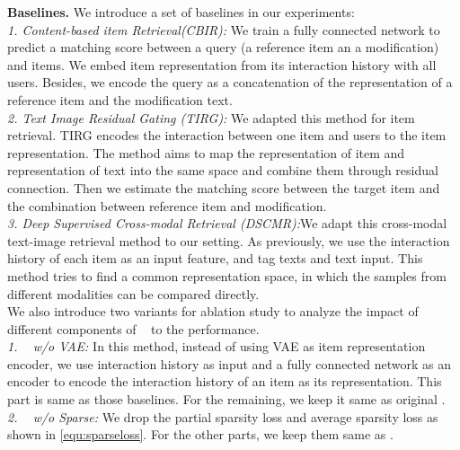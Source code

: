 \textbf{Baselines.} We introduce a set of baselines in our experiments:\\
\textit{1. Content-based item Retrieval(CBIR):} We train a fully connected network to predict a matching score between a query (a reference item an a modification) and items. We embed item representation from its interaction history with all users. Besides, we encode the query as a concatenation of the representation of a reference item and the modification text.\\
\textit{2. Text Image Residual Gating \cite{Vo19TIRG} (TIRG):} We adapted this method for item retrieval. TIRG encodes the interaction between one item and users to the item representation. The method aims to map the representation of item and representation of text into the same space and combine them through residual connection. Then we estimate the matching score between the target item and the combination between reference item and modification.\\
\textit{3. Deep Supervised Cross-modal Retrieval \cite{Zhen19DSCMR} (DSCMR):}We adapt this cross-modal text-image retrieval method to our setting. As previously, we use the interaction history of each item as an input feature, and tag texts and text input. This method tries to find a common representation space, in which the samples from different modalities can be compared directly.\\
We also introduce two variants for ablation study to analyze the impact of different components of \CGIR~ to the performance.\\
\textit{1. \CGIR~ w/o VAE:} In this method, instead of using VAE as item representation encoder, we use interaction history as input and a fully connected network as an encoder to encode the interaction history of an item as its representation. This part is same as those baselines. For the remaining, we keep it same as original \CGIR.\\
\textit{2. \CGIR~ w/o Sparse:} We drop the partial sparsity loss and average sparsity loss as shown in \ref{equ:sparseloss}. For the other parts, we keep them same as \CGIR.\\



